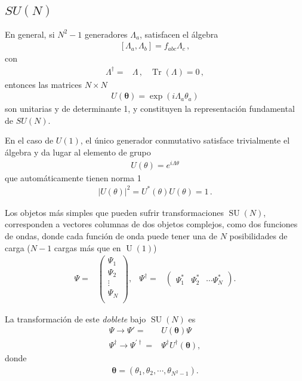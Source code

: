 \subsection{$SU(N)$}


En general, si $N^{2}-1$ generadores $\Lambda_a$, satisfacen el álgebra
\begin{align}
  \left[ \Lambda_a,\Lambda_b \right]=f_{abc}\Lambda_{c}\,,
\end{align}
con
\begin{align}
  \Lambda^{\dagger}=&\Lambda\,, & \operatorname{Tr}(\Lambda)=0\,,
\end{align}
entonces las matrices $N\times N$  
\begin{align}
  U(\boldsymbol{\theta})=\exp\left( i \Lambda_{a}\theta_{a} \right)
\end{align}
son unitarias y de determinante 1, y constituyen la representación fundamental de $SU(N)$.

En el caso de $U(1)$, el único generador conmutativo satisface trivialmente el álgebra y da lugar al elemento de grupo
\begin{align}
  U(\theta)=e^{i\Lambda \theta}
\end{align}
que automáticamente tienen norma 1
\begin{align*}
|U(\theta)|^2= U^{*}(\theta)U(\theta)=1\,.
\end{align*}


Los objetos más simples que pueden sufrir transformaciones  $\operatorname{SU}(N)$, corresponden a vectores columnas de dos objetos complejos, como dos funciones de ondas, donde cada función de onda puede tener una de $N$ posibilidades de carga ($N-1$ cargas más que en $\operatorname{U}(1)$)
\begin{align}
  \Psi=&
  \begin{pmatrix}
    \Psi_1\\
    \Psi_2\\
    \vdots\\
    \Psi_N\\
  \end{pmatrix},&
  \Psi^{\dagger}=&
  \begin{pmatrix}
    \Psi_1^{*} &
    \Psi_2^{*}& \cdots \Psi_N^{*} 
  \end{pmatrix}.                  
\end{align}

La transformación de este \emph{doblete} bajo $\operatorname{SU}(N)$ es
\begin{align}
  \Psi\to \Psi'=& U(\boldsymbol{\theta}) \Psi \nonumber\\
  \Psi^{\dagger}\to \Psi^{\prime\dagger} =& \Psi^{\dagger}U^{\dagger}(\boldsymbol{\theta}),
\end{align}
donde
\begin{align}
  \boldsymbol{\theta}=\left(\theta_1,\theta_2,\cdots,\theta_{N^2-1}  \right).
\end{align}

